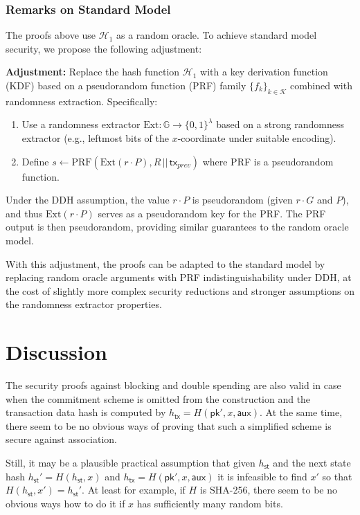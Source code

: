 \documentclass{article}
\newcommand{\pubkey}[0]{\mathsf{pk}}
\newcommand{\sthash}[0]{h_\mathsf{st}}
\newcommand{\txhash}[0]{h_\mathsf{tx}}
\newcommand{\auxd}[0]{\mathsf{aux}}
\begin{document}
\subsubsection{Remarks on Standard Model}

The proofs above use $\mathcal{H}_1$ as a random oracle. To achieve standard model security, we propose the following adjustment:

\textbf{Adjustment:} Replace the hash function $\mathcal{H}_1$ with a key derivation function (KDF) based on a pseudorandom function (PRF) family $\{f_k\}_{k \in \mathcal{K}}$ combined with randomness extraction. Specifically:
\begin{enumerate}
\item Use a randomness extractor $\text{Ext} \colon \mathbb{G} \to \{0,1\}^\lambda$ based on a strong randomness extractor (e.g., leftmost bits of the $x$-coordinate under suitable encoding).
\item Define $s \leftarrow \text{PRF}(\text{Ext}(r \cdot P), R \,||\, \mathsf{tx}_{prev})$ where PRF is a pseudorandom function.
\end{enumerate}

Under the DDH assumption, the value $r \cdot P$ is pseudorandom (given $r \cdot G$ and $P$), and thus $\text{Ext}(r \cdot P)$ serves as a pseudorandom key for the PRF. The PRF output is then pseudorandom, providing similar guarantees to the random oracle model.

With this adjustment, the proofs can be adapted to the standard model by replacing random oracle arguments with PRF indistinguishability under DDH, at the cost of slightly more complex security reductions and stronger assumptions on the randomness extractor properties.


\section{Discussion}

The security proofs against blocking and double spending are also valid in case when the commitment scheme is omitted from the construction and the transaction data hash is computed by $\txhash = H(\pubkey',x,\auxd)$.
At the same time, there seem to be no obvious ways of proving that such a simplified scheme is secure against association.

Still, it may be a plausible practical assumption that given $\sthash$ and the next state hash $\sthash'=H(\sthash,x)$ and $\txhash = H(\pubkey',x,\auxd)$ it is infeasible to find $x'$ so that $H(\sthash,x')=\sthash'$. At least for example, if $H$ is \textsf{SHA-256}, there seem to be no obvious ways how to do it if $x$ has sufficiently many random bits.
\end{document}
